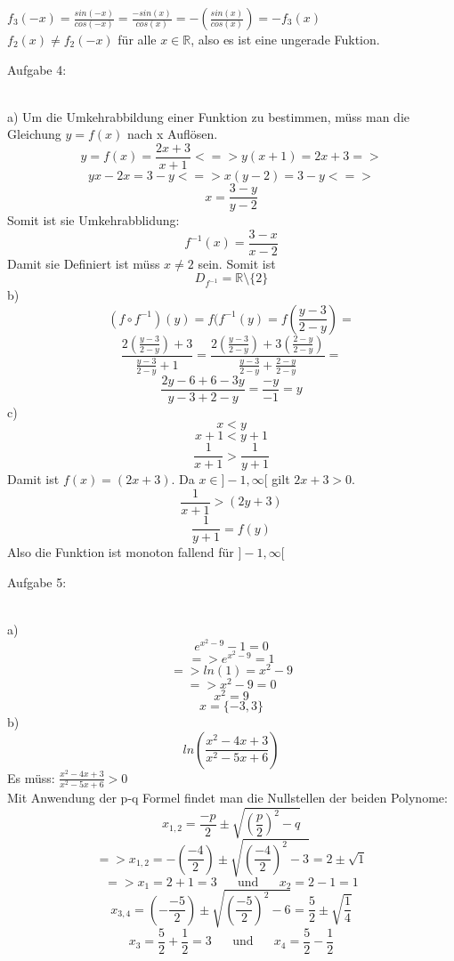 \documentclass[11pt]{article}
\begin{document}
				\noindent $f_3(-x)=\frac{sin(-x)}{cos(-x)}=\frac{-sin(x)}{cos(x)}=-\left(\frac{sin(x)}{cos(x)}\right)=-f_3(x)$\\
				$f_2(x) \neq f_2(-x)$ für alle $x\in\mathbb{R}$, also es ist eine ungerade Fuktion.\\
		\noindent \begin{Large}Aufgabe 4:\end{Large}\\[2pt]
			\indent a)
				Um die Umkehrabbildung einer Funktion zu bestimmen, müss man die Gleichung $y=f(x)$ nach x Auflösen.
				$$y=f(x)=\frac{2x+3}{x+1} <=> y(x+1)=2x+3=>$$
				$$yx-2x=3-y <=> x(y-2)=3-y<=>$$
				$$x=\frac{3-y}{y-2}$$
				Somit ist sie Umkehrabblidung:
				$$f^{-1}(x)=\frac{3-x}{x-2}$$
				Damit sie Definiert ist müss $x \neq 2$ sein. Somit ist
				$$D_{f^{-1}}=\mathbb{R}\setminus\{2\}$$
			\indent b)
				$$(f \circ f^{-1})(y) = f(f^{-1}(y)=f\left(\frac{y-3}{2-y}\right)=$$
				$$\frac{2\left(\frac{y-3}{2-y}\right)+3}{\frac{y-3}{2-y}+1}=\frac{2\left(\frac{y-3}{2-y}\right)+3\left(\frac{2-y}{2-y}\right)}{\frac{y-3}{2-y}+\frac{2-y}{2-y}}=$$
				$$\frac{2y-6+6-3y}{y-3+2-y}=\frac{-y}{-1}=y$$
			\indent c)\\
				$$x<y$$
				$$x+1<y+1$$
				$$\frac{1}{x+1}>\frac{1}{y+1}$$
				Damit ist $f(x)=(2x+3)$. Da $x \in ]-1,\infty[$ gilt $2x+3>0$.
				$$\frac{1}{x+1}>(2y+3)$$
				$$\frac{1}{y+1}=f(y)$$
				Also die Funktion ist monoton fallend für $]-1,\infty[$\\
		\noindent \begin{Large}Aufgabe 5:\end{Large}\\[2pt]
			\indent a)
				$$e^{x^2-9}-1=0$$
				$$=> e^{x^2-9}=1$$
				$$=>ln(1)=x^2-9$$
				$$=>x^2-9=0$$
				$$x^2=9$$
				$$x=\{-3,3\}$$
			\indent b)
						$$ln\left(\frac{x^2-4x+3}{x^2-5x+6}\right)$$
						Es müss: $\frac{x^2-4x+3}{x^2-5x+6} >0$\\
						Mit Anwendung der p-q Formel findet man die Nullstellen der beiden Polynome:\\
						$$x_{1,2}=\frac{-p}{2}\pm \sqrt{\left(\frac{p}{2}\right)^2-q}$$
						$$=>x_{1,2}=-\left(\frac{-4}{2}\right)\pm \sqrt{\left(\frac{-4}{2}\right)^2-3}=2 \pm \sqrt{1}$$
						$$=>x_1 = 2+1=3 \hspace{20pt}\mbox{und}\hspace{20pt} x_2 = 2-1=1$$
						$$x_{3,4}=\left(-\frac{-5}{2}\right)\pm \sqrt{\left(\frac{-5}{2}\right)^2-6}= \frac{5}{2} \pm \sqrt{\frac{1}{4}}$$
						$$x_3=\frac{5}{2}+\frac{1}{2}=3 \hspace{20pt}\mbox{und}\hspace{20pt} x_4=\frac{5}{2}-\frac{1}{2}$$
\end{document}
